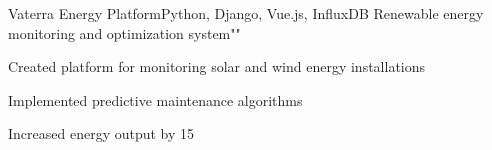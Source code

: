 \resumeSubheading
  {Vaterra Energy Platform}{Python, Django, Vue.js, InfluxDB}
  {Renewable energy monitoring and optimization system}{""}
  \vspace{\experienceItemSpacing}
  \resumeItemListStart
\item Created platform for monitoring solar and wind energy installations
\item Implemented predictive maintenance algorithms
\item Increased energy output by 15%
  \resumeItemListEnd